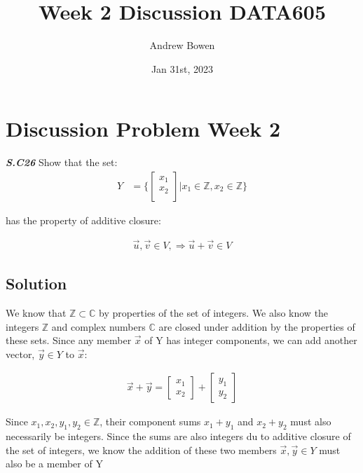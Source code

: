 \documentclass{article}
\title{Week 2 Discussion DATA605}
\author{Andrew Bowen}
\date{Jan 31st, 2023}
\begin{document}
\maketitle
\section{Discussion Problem Week 2}
\textbf{\textit{S.C26}} Show that the set:
\begin{align}
    Y &= \{ \begin{bmatrix}
        x_{1} \\
        x_{2} \\
    \end{bmatrix} |
     x_{1} \in{} \mathbb{Z},
     x_{2} \in{} \mathbb{Z}
    \}
\end{align}

has the property of additive closure: 

\begin{align}
  \Vec{u}, \Vec{v} \in{} \textit{V}, \Rightarrow \Vec{u} + \Vec{v} \in{} \textit{V}
\end{align}

\subsection{Solution}

We know that $\mathbb{Z} \subset{} \mathbb{C}$ by properties of the set of integers. We also know the integers $\mathbb{Z}$ and complex numbers $\mathbb{C}$ are closed under addition by the properties of these sets. Since any member $\Vec{x}$ of Y has integer components, we can add another vector, $\Vec{y} \in{} Y$ to $\Vec{x}$:

\begin{align}
    \Vec{x} + \Vec{y} = \begin{bmatrix}
                            x_{1} \\
                            x_{2}
                        \end{bmatrix}
                        +
                        \begin{bmatrix}
                            y_{1} \\
                            y_{2}
                        \end{bmatrix}
\end{align}

Since $x_{1}, x_{2}, y_{1}, y_{2} \in{} \mathbb{Z}$, their component sums $x_{1} + y_{1}$ and $x_{2} + y_{2}$ must also necessarily be integers. Since the sums are also integers du to additive closure of the set of integers, we know the addition of these two members $\Vec{x}, \Vec{y} \in{} Y$ must also be a member of Y
\end{document}
